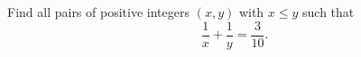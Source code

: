 Find all pairs of positive integers $(x,y)$ with $x\le y$ such that
\[\dfrac1x+\dfrac1y=\dfrac{3}{10}.\]
